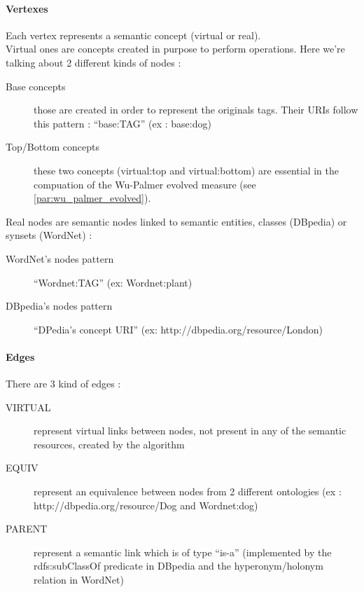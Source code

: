 \paragraph{Vertexes} %
\label{par:vertexes}
Each vertex represents a semantic concept (virtual or real).\\
Virtual ones are concepts created in purpose to perform operations. Here we’re talking about 2 different kinds of nodes :
\begin{description}
	\item[Base concepts] those are created in order to represent the originals tags. Their URIs follow this pattern : “base:TAG” (ex : base:dog)
	\item[Top/Bottom concepts] these two concepts (virtual:top and virtual:bottom) are essential in the compuation of the Wu-Palmer evolved measure (see \ref{par:wu_palmer_evolved}).
\end{description}
Real nodes are semantic nodes linked to semantic entities, classes (DBpedia) or synsets (WordNet) :
\begin{description}
	\item[WordNet's nodes pattern] “Wordnet:TAG” (ex: Wordnet:plant)
	\item[DBpedia's nodes pattern] “DPedia’s concept URI” (ex: http://dbpedia.org/resource/London)
\end{description}
\paragraph{Edges} %
\label{par:edges}
There are 3 kind of edges :
\begin{description}
	\item[VIRTUAL] represent virtual links between nodes, not present in any of the semantic resources, created by the algorithm
	\item[EQUIV] represent an equivalence between nodes from 2 different ontologies (ex : http://dbpedia.org/resource/Dog and Wordnet:dog)
	\item[PARENT] represent a semantic link which is of type “is-a” (implemented by the rdfs:subClassOf predicate in DBpedia and the hyperonym/holonym relation in WordNet)
\end{description}
